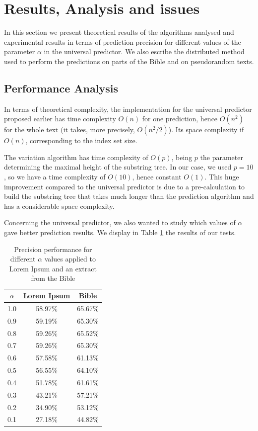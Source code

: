 \documentclass[a4paper,12pt]{article}
\begin{document}
  \section{Results, Analysis and issues}\label{tests}

  In this section we present theoretical results of the algorithms analysed and experimental results in terms of prediction precision for different values of the parameter $\alpha$ in the universal predictor. We also escribe the distributed method used to perform the predictions on parts of the Bible and on pseudorandom texts.

  \subsection{Performance Analysis}

  In terms of theoretical complexity, the implementation for the universal predictor proposed earlier has time complexity $O(n)$ for one prediction, hence $O(n^2)$ for the whole text (it takes, more precisely, $O(n^2/2)$). Its space complexity if $O(n)$, corresponding to the index set size.

  The variation algorithm has time complexity of $O(p)$, being $p$ the parameter determining the maximal height of the substring tree. In our case, we used $p=10$, so we have a time complexity of $O(10)$, hence constant $O(1)$. This huge improvement compared to the universal predictor is due to a pre-calculation to build the substring tree that takes much longer than the prediction algorithm and has a considerable space complexity.

  Concerning the universal predictor, we also wanted to study which values of $\alpha$ gave better prediction results. We display in Table \ref{alpha} the results of our tests.

 \begin{table}
    \centering
    \begin{tabular}{c || c  c}
      $\alpha$ & Lorem Ipsum & Bible \\\hline\hline
      1.0 & 58.97\% & 65.67\% \\\hline
      0.9 & 59.19\% & 65.30\% \\\hline
      0.8 & 59.26\% & 65.52\% \\\hline
      0.7 & 59.26\% & 65.30\% \\\hline
      0.6 & 57.58\% & 61.13\% \\\hline
      0.5 & 56.55\% & 64.10\% \\\hline
      0.4 & 51.78\% & 61.61\% \\\hline
      0.3 & 43.21\% & 57.21\% \\\hline
      0.2 & 34.90\% & 53.12\% \\\hline
      0.1 & 27.18\% & 44.82\%
    \end{tabular}
    \caption{\label{alpha} Precision performance for different $\alpha$ values applied to Lorem Ipsum and an extract from the Bible}
  \end{table}
\end{document}
